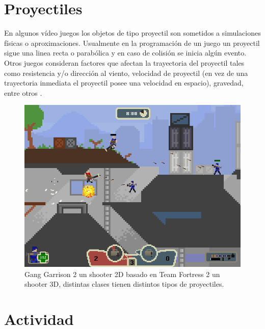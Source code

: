 \section{Proyectiles}
En algunos vídeo juegos los objetos de tipo proyectil son sometidos a simulaciones físicas o aproximaciones. Usualmente en la programación de un juego un proyectil sigue una linea recta o parabólica y en caso de colisión se inicia algún evento. Otros juegos consideran factores que afectan la trayectoria del proyectil tales como resistencia y/o dirección al viento, velocidad de proyectil (en vez de una trayectoria inmediata el proyectil posee una velocidad en espacio), gravedad, entre otros \cite{fifa_physics}.

\begin{figure}[H]
\centering
\includegraphics[width=0.9\linewidth]{semana7/Gang_Garrison_2.png} 
\caption{Gang Garrison 2 un shooter 2D basado en Team Fortress 2 un shooter 3D, distintas clases tienen distintos tipos de proyectiles.}
\end{figure}


\section{Actividad}
